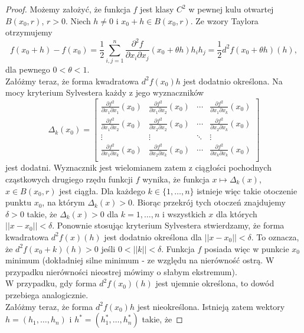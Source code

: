 \documentclass[leqno]{article}
\begin{document}
\begin{justify}
\begin{proof}
    Możemy założyć, że funkcja $f$ jest klasy $C^2$ w pewnej kulu otwartej $B(x_0, r)$, $r > 0$. Niech $h \neq 0$ i $x_0 + h \in B(x_0, r)$. 
    Ze wzory Taylora otrzymujemy 
    \[
        f(x_0 + h) - f(x_0) = \frac{1}{2}\sum_{i,j=1}^{n}\frac{\partial ^2 f}{\partial x_i \partial x_j}(x_0 + \theta h)h_i h_j = \frac{1}{2}d^2f(x_0 + \theta h)(h),
    \]
    dla pewnego $0 < \theta < 1$. \\ 
    Załóżmy teraz, że forma kwadratowa $d^2 f(x_0)h$ jest dodatnio określona. Na mocy kryterium Sylvestera każdy z jego wyznaczników 
    \[
        \Delta_k(x_0) = \begin{bmatrix}
                \frac{\partial f^2}{\partial x_1 \partial x_1}(x_0) & \frac{\partial f^2}{\partial x_1 \partial x_2}(x_0) & \cdots & \frac{\partial f^2}{\partial x_1 \partial x_k}(x_0) \\
                \frac{\partial f^2}{\partial x_1 \partial x_2}(x_0) & \frac{\partial f^2}{\partial x_2 \partial x_2}(x_0) & \cdots & \frac{\partial f^2}{\partial x_2 \partial x_k}(x_0) \\
                \vdots & \vdots & \ddots & \vdots \\
                \frac{\partial f^2}{\partial x_1 \partial x_k}(x_0) & \frac{\partial f^2}{\partial x_2 \partial x_k}(x_0) & \cdots & \frac{\partial f^2}{\partial x_k \partial x_k}(x_0) \\
                \end{bmatrix}
    \]
    jest dodatni. Wyznacznik jest wielomianem zatem z ciągłości pochodnych cząstkowych drugiego rzędu funkcji $f$ wynika, że funkcja $x \mapsto \Delta_k(x)$, $x \in B(x_0, r)$ jest ciągła. 
    Dla każdego $k \in \{1, \ldots, n\}$ istnieje więc takie otoczenie punktu $x_0$, na którym $\Delta_k(x) > 0$. Biorąc przekrój tych otoczeń znajdujemy $\delta > 0$
    takie, że $\Delta_k(x) > 0$ dla $k = 1, \ldots, n$ i wszystkich $x$ dla których $||x - x_0|| < \delta$. Ponownie stosując kryterium Sylvestera stwierdzamy, że 
    forma kwadratowa $d^2 f(x)(h)$ jest dodatnio określona dla $||x - x_0|| < \delta$. To oznacza, że $d^2 f(x_0 + k)(h) > 0$ jeśli $ 0 < ||k|| < \delta$.
    Funkcja $f$ posiada więc w punkcie $x_0$ minimum (dokładniej silne minimum - ze względu na nierówność ostrą. W przypadku nierówności nieostrej mówimy o słabym ekstremum). \\
    W przypadku, gdy forma $d^2f(x_0)(h)$ jest ujemnie określona, to dowód przebiega analogicznie. \\
    Załóżmy teraz, że forma $d^2 f(x_0)h$ jest nieokreślona. Istnieją zatem wektory $h = (h_1, \ldots, h_n)$ i $h^* = (h_1^*, \ldots, h_n^*)$ takie, że 

\end{proof}
\end{justify}
\end{document}
